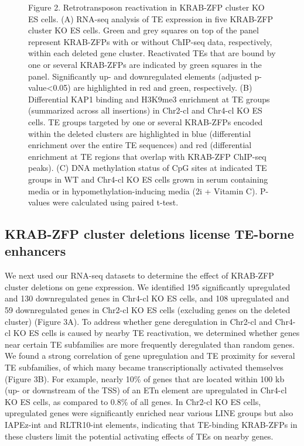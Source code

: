 \documentclass[11pt,a4paper]{article}
\begin{document}
\begin{figure}[h]
\caption{Figure 2. Retrotransposon reactivation in KRAB-ZFP cluster KO ES cells. (A) RNA-seq analysis of TE expression in five KRAB-ZFP cluster KO ES cells. Green and grey squares on top of the panel represent KRAB-ZFPs with or without ChIP-seq data, respectively, within each deleted gene cluster. Reactivated TEs that are bound by one or several KRAB-ZFPs are indicated by green squares in the panel. Significantly up- and downregulated elements (adjusted p-value<0.05) are highlighted in red and green, respectively. (B) Differential KAP1 binding and H3K9me3 enrichment at TE groups (summarized across all insertions) in Chr2-cl and Chr4-cl KO ES cells. TE groups targeted by one or several KRAB-ZFPs encoded within the deleted clusters are highlighted in blue (differential enrichment over the entire TE sequences) and red (differential enrichment at TE regions that overlap with KRAB-ZFP ChIP-seq peaks). (C) DNA methylation status of CpG sites at indicated TE groups in WT and Chr4-cl KO ES cells grown in serum containing media or in hypomethylation-inducing media (2i + Vitamin C). P-values were calculated using paired t-test.}
\end{figure}

\subsection{KRAB-ZFP cluster deletions license TE-borne enhancers}

We next used our RNA-seq datasets to determine the effect of KRAB-ZFP cluster deletions on gene expression. We identified 195 significantly upregulated and 130 downregulated genes in Chr4-cl KO ES cells, and 108 upregulated and 59 downregulated genes in Chr2-cl KO ES cells (excluding genes on the deleted cluster) (Figure 3A). To address whether gene deregulation in Chr2-cl and Chr4-cl KO ES cells is caused by nearby TE reactivation, we determined whether genes near certain TE subfamilies are more frequently deregulated than random genes. We found a strong correlation of gene upregulation and TE proximity for several TE subfamilies, of which many became transcriptionally activated themselves (Figure 3B). For example, nearly 10\% of genes that are located within 100 kb (up- or downstream of the TSS) of an ETn element are upregulated in Chr4-cl KO ES cells, as compared to 0.8\% of all genes. In Chr2-cl KO ES cells, upregulated genes were significantly enriched near various LINE groups but also IAPEz-int and RLTR10-int elements, indicating that TE-binding KRAB-ZFPs in these clusters limit the potential activating effects of TEs on nearby genes.
\end{document}
